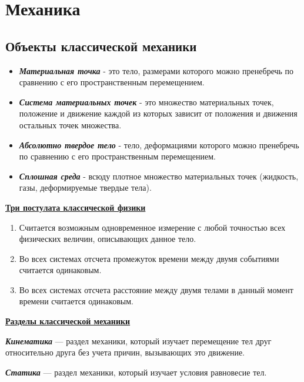 \documentclass[../main.tex]{subfiles}
\begin{document}
\chapter{Механика}
\section{Объекты классической механики}
\begin{itemize}
    \item {} \textbf{\textit{Материальная точка}} - это тело, размерами которого можно пренебречь по сравнению с его пространственным перемещением.
    \item {} \textbf{\textit{Система материальных точек} }- это множество материальных точек, положение и движение каждой из которых зависит от положения и движения остальных точек множества.
    \item {} \textbf{\textit{Абсолютно твердое тело}} - тело, деформациями которого можно пренебречь по сравнению с его пространственным перемещением.
    \item {} \textbf{\textit{Сплошная среда}} - всюду плотное множество материальных точек (жидкость, газы, деформируемые твердые тела).
\end{itemize}

\vspace{5px}

\underline{\textbf{Три постулата классической физики}}
\begin{enumerate}
    \item Считается возможным одновременное измерение с любой точностью всех физических величин, описывающих данное тело.
    \item Во всех системах отсчета промежуток времени между двумя событиями считается одинаковым.
    \item Во всех системах отсчета расстояние между двумя телами в данный момент времени считается одинаковым.
\end{enumerate}

\underline{\textbf{Разделы классической механики}}

\vspace{5px}

 \textbf{\textit{Кинематика}} --- раздел механики, который изучает перемещение тел друг относительно друга без учета причин, вызывающих это движение.

\vspace{5px}

 \textbf{\textit{Статика}} --- раздел механики, который изучает условия равновесие тел.
\end{document}
